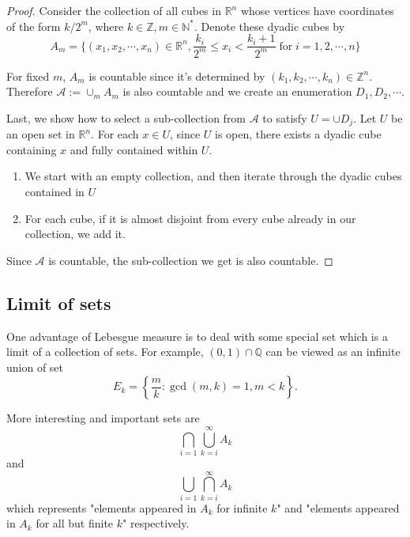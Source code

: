 \documentclass[dvipsnames]{article}
\numberwithin{equation}{section}
\begin{document}
\begin{proof}
Consider the collection of all cubes in $\mathbb{R}^n$ whose vertices have coordinates of the form $k/2^m$, where $k\in\mathbb{Z}, m\in\mathbb{N}^{*}$. Denote these dyadic cubes by 
$$
A_{m}= \{(x_1, x_2, \cdots, x_{n})\in\mathbb{R}^{n}, \frac{k_i}{2^m}\leq x_{i} <\frac{k_i+1}{2^{m}}\;\text{for}\; i=1,2,\cdots, n\}
$$ 

For fixed $m$, $A_{m}$ is countable since it's determined by $(k_1, k_2,\cdots, k_{n})\in\mathbb{Z}^{n}$. Therefore $\mathcal{A}:=\cup_{m} A_{m}$ is also countable and we create an enumeration $D_{1}, D_{2},\cdots$. 

Last, we show how to select a sub-collection from $\mathcal{A}$ to satisfy $U = \cup D_{j}$. 
Let $U$ be an open set in $\mathbb{R}^n$. For each $x \in U$, since $U$ is open, there exists a dyadic cube containing $x$ and fully contained within $U$.

\begin{enumerate}
    \item We start with an empty collection, and then iterate through the dyadic cubes contained in $U$

    \item For each cube, if it is almost disjoint from every cube already in our collection, we add it.
    \begin{center}
    
    \end{center}
\end{enumerate}
Since $\mathcal{A}$ is countable, the sub-collection we get is also countable.
\end{proof}

\subsection{Limit of sets}

One advantage of Lebesgue measure is to deal with some special set which is a limit of a collection of sets. For example,
$(0,1) \cap \mathbb{Q}$ can be viewed as an infinite union of set
$$
E_{k} = \left\{\frac{m}{k}: \operatorname{gcd}(m,k)=1, m<k \right\}.
$$

More interesting and important sets are
$$
\bigcap_{i=1} \bigcup_{k=i}^{\infty} A_{k}
$$
and
\begin{equation}
\label{basic_set2}
    \bigcup_{i=1} \bigcap_{k=i}^{\infty} A_{k}
\end{equation}
which represents "elements appeared in $A_{k}$ for infinite $k$" and "elements appeared in $A_{k}$ for all but finite $k$" respectively.
\end{document}
